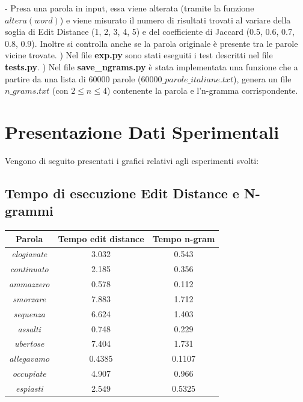 \documentclass[a4paper,12pt]{article}
\begin{document}
\newline
\newline
- Presa una parola in input, essa viene alterata (tramite la funzione $altera(word)$) e viene misurato il numero di risultati trovati al variare della soglia di Edit Distance (1, 2, 3, 4, 5) e del coefficiente di Jaccard (0.5, 0.6, 0.7, 0.8, 0.9). Inoltre si controlla anche se la parola originale è presente tra le parole vicine trovate.
\newline
{}) Nel file \textbf{exp.py} sono stati eseguiti i test descritti nel file \textbf{tests.py}.
\newline
{}) Nel file \textbf{save\_ngrams.py} è stata implementata una funzione che a partire da una lista di 60000 parole ($60000\_parole\_italiane.txt$), genera un file $n\_grams.txt$ (con $2 \leq n \leq 4$) contenente la parola e l'n-gramma corrispondente.

\clearpage
\section{Presentazione Dati Sperimentali}
Vengono di seguito presentati i grafici relativi agli esperimenti svolti:
\newline
\subsection{Tempo di esecuzione Edit Distance e N-grammi}
\begin{center}
\vspace*{0.7cm}
\begin{tabular}{|c|c|c|}
\hline
\textbf{Parola}\bigstrut & \textbf{Tempo edit distance}  & \textbf{Tempo n-gram} \\ \hline
 \textit{elogiavate}\bigstrut & 3.032 & 0.543 \\\hline
 \textit{continuato}\bigstrut & 2.185 & 0.356 \\\hline
 \textit{ammazzero}\bigstrut & 0.578 & 0.112 \\\hline
 \textit{smorzare}\bigstrut & 7.883 & 1.712 \\\hline
 \textit{sequenza}\bigstrut & 6.624 & 1.403 \\\hline
 \textit{assalti}\bigstrut & 0.748 & 0.229 \\\hline
 \textit{ubertose}\bigstrut & 7.404 & 1.731 \\\hline
 \textit{allegavamo}\bigstrut & 0.4385 & 0.1107 \\\hline
 \textit{occupiate}\bigstrut & 4.907 & 0.966 \\\hline
 \textit{espiasti}\bigstrut & 2.549 & 0.5325 \\\hline

\end{tabular}
\captionsetup{justification=centering,margin=1.05cm}
\end{center}
\end{document}

